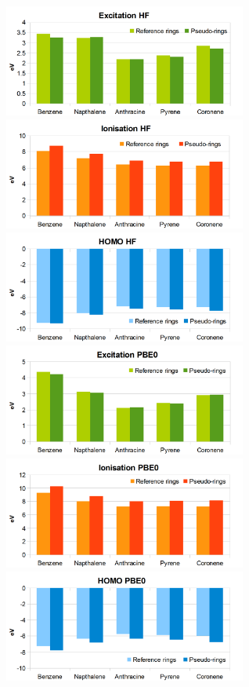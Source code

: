 \documentclass[journal=jctcce,manuscript=article]{achemso}
\begin{document}
\begin{figure}[h]
\includegraphics[width=8cm]{ring_hf_excitation}
\includegraphics[width=8cm]{ring_hf_ionisation}
\includegraphics[width=8cm]{ring_hf_homo}
\includegraphics[width=8cm]{ring_pbe0_excitation}
\includegraphics[width=8cm]{ring_pbe0_ionisation}
\includegraphics[width=8cm]{ring_pbe0_homo}

\end{figure}
\end{document}
